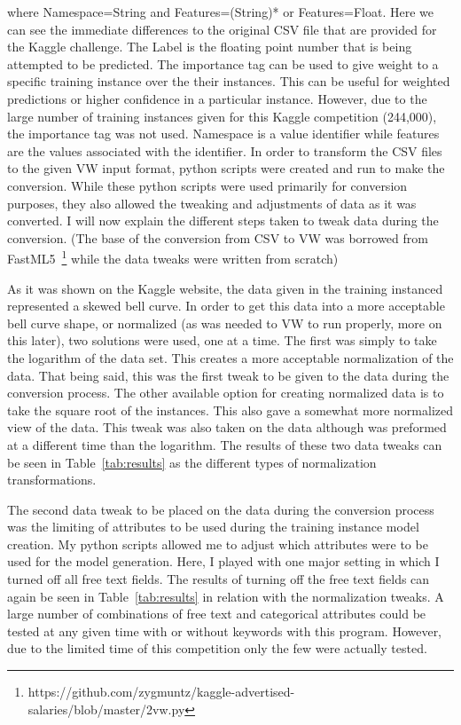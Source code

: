 \documentclass[conference]{IEEEtran}
\begin{document}
where Namespace=String and Features=(String)* or Features=Float. Here we
can see the immediate differences to the original CSV file that are provided
for the Kaggle challenge. The Label is the floating point number that is being
attempted to be predicted. The importance tag can be used to give weight
to a specific training instance over the their instances. This can be useful for
weighted predictions or higher confidence in a particular instance. However,
due to the large number of training instances given for this Kaggle competition
(244,000), the importance tag was not used. Namespace is a value identifier
while features are the values associated with the identifier. In order to transform 
the CSV files to the given VW input format, python scripts were created
and run to make the conversion. While these python scripts were used primarily for 
conversion purposes, they also allowed the tweaking and adjustments of
data as it was converted. I will now explain the different steps taken to tweak
data during the conversion. (The base of the conversion from CSV to VW was
borrowed from FastML5~\footnote{https://github.com/zygmuntz/kaggle-advertised-salaries/blob/master/2vw.py}
while the data tweaks were written from scratch)

As it was shown on the Kaggle website, the data given in the training instanced
represented a skewed bell curve. In order to get this data into a more acceptable
bell curve shape, or normalized (as was needed to VW to run properly, more on
this later), two solutions were used, one at a time. The first was simply to take
the logarithm of the data set. This creates a more acceptable normalization of
the data. That being said, this was the first tweak to be given to the data during
the conversion process. The other available option for creating normalized data
is to take the square root of the instances. This also gave a somewhat more
normalized view of the data. This tweak was also taken on the data although
was preformed at a different time than the logarithm. The results of these two
data tweaks can be seen in Table~\ref{tab:results} as the different types of normalization
transformations.

The second data tweak to be placed on the data during the conversion process
was the limiting of attributes to be used during the training instance model
creation. My python scripts allowed me to adjust which attributes were to be
used for the model generation. Here, I played with one major setting in which
I turned off all free text fields. The results of turning off the free text fields can
again be seen in Table~\ref{tab:results} in relation with the normalization tweaks. A large
number of combinations of free text and categorical attributes could be tested
at any given time with or without keywords with this program. However, due
to the limited time of this competition only the few were actually tested.
\end{document}
